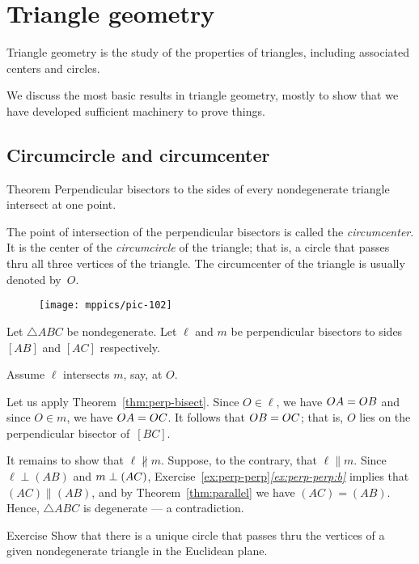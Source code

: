 \chapter{Triangle geometry}\label{chap:triangle}

Triangle geometry is the study of the properties of triangles, including associated centers and circles.

We discuss the most basic results in triangle geometry, 
mostly to show that we have developed sufficient machinery to prove things.

\section{Circumcircle and circumcenter}

\begin{thm}{Theorem}\label{thm:circumcenter}
Perpendicular bisectors to the sides of every nondegenerate triangle intersect at one point.
\end{thm}

The point of intersection of the perpendicular bisectors is called the \emph{circumcenter}.
It is the center of the \emph{circumcircle} of the triangle;
that is, a circle that passes thru all three vertices of the triangle.
The circumcenter of the triangle is usually denoted by~$O$.

\begin{wrapfigure}{o}{29mm}
\centering
\texttt{[image: mppics/pic-102]}
\end{wrapfigure}


Let $\triangle ABC$ be nondegenerate.
Let $\ell$ and $m$ be perpendicular bisectors to sides $[AB]$ and $[AC]$ respectively.

Assume $\ell$ intersects $m$, say, at $O$.

Let us apply Theorem~\ref{thm:perp-bisect}.
Since $O\in\ell$, we have $OA=OB$ and since $O\in m$, we have $OA=OC$.
It follows that $OB=OC$;
that is, $O$ lies on the perpendicular bisector of~$[B C]$.

It remains to show that $\ell\nparallel m$.
Suppose, to the contrary, that $\ell\parallel m$.
Since $\ell\perp(AB)$ and $m\perp(AC)$, Exercise~\ref{ex:perp-perp}\textit{\ref{ex:perp-perp:b}} implies that
$(AC)\parallel(AB)$, and by Theorem~\ref{thm:parallel} we have $(AC)=(AB)$.
Hence, $\triangle ABC$ is degenerate --- a contradiction.
\qeds

\begin{thm}[!]{Exercise}\label{ex:unique-cline}
Show that there is a unique circle that passes thru the vertices of a given nondegenerate triangle in the Euclidean plane.
\end{thm}



